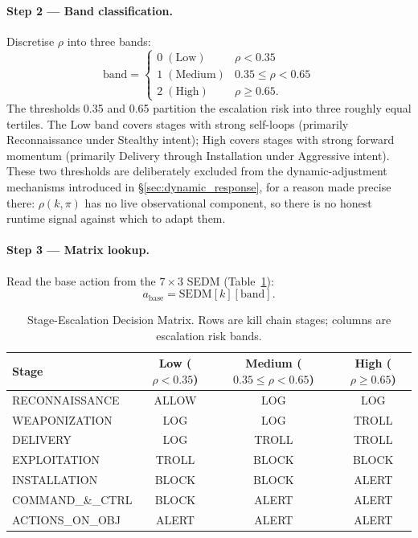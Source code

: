 \paragraph{Step 2 — Band classification.}
Discretise $\rho$ into three bands:
%
\begin{equation}
  \text{band} =
  \begin{cases}
    0 \; (\text{Low})    & \rho < 0.35 \\
    1 \; (\text{Medium}) & 0.35 \leq \rho < 0.65 \\
    2 \; (\text{High})   & \rho \geq 0.65.
  \end{cases}
\end{equation}
%
The thresholds 0.35 and 0.65 partition the escalation risk into three
roughly equal tertiles.
The Low band covers stages with strong self-loops (primarily Reconnaissance
under Stealthy intent); High covers stages with strong forward momentum
(primarily Delivery through Installation under Aggressive intent). These two
thresholds are deliberately excluded from the dynamic-adjustment mechanisms
introduced in \S\ref{sec:dynamic_response}, for a reason made precise there:
$\rho(k, \pi)$ has no live observational component, so there is no honest
runtime signal against which to adapt them.

\paragraph{Step 3 — Matrix lookup.}
Read the base action from the $7 \times 3$ SEDM
(Table~\ref{tab:sedm_matrix}):
%
\begin{equation}
  a_{\text{base}} = \text{SEDM}[k][\text{band}].
\end{equation}

\begin{table}[ht]
  \centering
  \caption{Stage-Escalation Decision Matrix.
           Rows are kill chain stages; columns are escalation risk bands.}
  \label{tab:sedm_matrix}
  \begin{tabular}{lccc}
    \toprule
    Stage & Low ($\rho < 0.35$) & Medium ($0.35 \leq \rho < 0.65$) & High ($\rho \geq 0.65$) \\
    \midrule
    RECONNAISSANCE   & ALLOW & LOG   & LOG   \\
    WEAPONIZATION    & LOG   & LOG   & TROLL \\
    DELIVERY         & LOG   & TROLL & TROLL \\
    EXPLOITATION     & TROLL & BLOCK & BLOCK \\
    INSTALLATION     & BLOCK & BLOCK & ALERT \\
    COMMAND\_\&\_CTRL & BLOCK & ALERT & ALERT \\
    ACTIONS\_ON\_OBJ & ALERT & ALERT & ALERT \\
    \bottomrule
  \end{tabular}
\end{table}

